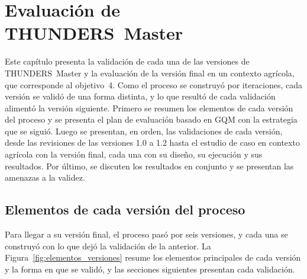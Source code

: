 \documentclass[12pt,letterpaper,oneside]{report}
\begin{document}
\chapter{Evaluación de THUNDERS~Master}
\label{ch:evaluacion}

Este capítulo presenta la validación de cada una de las versiones de
THUNDERS~Master y la evaluación de la versión final en un contexto agrícola, que
corresponde al objetivo~4. Como el proceso se construyó por iteraciones, cada
versión se validó de una forma distinta, y lo que resultó de cada validación
alimentó la versión siguiente. Primero se resumen los elementos de cada versión
del proceso y se presenta el plan de evaluación basado en GQM con la estrategia
que se siguió. Luego se presentan, en orden, las validaciones de cada versión, desde las
revisiones de las versiones 1.0 a 1.2 hasta el estudio de caso en contexto
agrícola con la versión final, cada una con su diseño, su ejecución y sus
resultados. Por último, se discuten los
resultados en conjunto y se presentan las amenazas a la validez.

\section{Elementos de cada versión del proceso}
\label{sec:elementos_versiones}
Para llegar a su versión final, el proceso pasó por seis versiones, y cada una
se construyó con lo que dejó la validación de la anterior. La Figura~\ref{fig:elementos_versiones} resume los
elementos principales de cada versión y la forma en que se validó, y las
secciones siguientes presentan cada validación.
\end{document}
